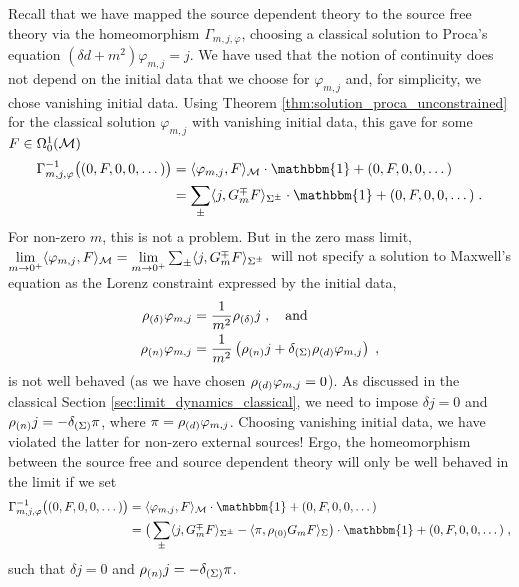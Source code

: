 Recall that we have mapped the source dependent theory to the source free theory via the homeomorphism $\Gamma_{m,j,\varphi}$, choosing a classical solution to Proca's equation $(\delta d + m^2)\varphi_{m,j} = j$. We have used that the notion of continuity does not depend on the initial data that we choose for $\varphi_{m,j}$ and, for simplicity, we chose vanishing initial data. Using Theorem \ref{thm:solution_proca_unconstrained} for the classical solution $\varphi_{m,j}$ with vanishing initial data, this gave for some $F \in \Omega^1_0(\mathcal{M})$
\begin{align}
	\Gamma^{-1}_{m,j,\varphi}\big( (0,F,0,0,\dots) \big)
	&= \langle \varphi_{m,j} , F \rangle_\M \cdot \mathbbm{1} + (0,F,0,0,\dots)   \notag \\
	&= \sum_{\pm}\langle j ,G_m^\mp F \rangle_{\Sigma^\pm} \cdot \mathbbm{1} + (0,F,0,0,\dots) \formspace.
\end{align}
For non-zero $m$, this is not a problem. But in the zero mass limit, $\lim\limits_{m \to 0^+} \langle \varphi_{m,j} , F \rangle_{\mathcal{M}} = \lim\limits_{m \to 0^+}  \sum_{\pm}\langle j ,G_m^\mp F \rangle_{\Sigma^\pm}$ will not specify a solution to Maxwell's equation as the Lorenz constraint expressed by the initial data,
\begin{align}
	\rho_{(\delta)} \varphi_{m,j} &= \frac{1}{m^2}\rho_{(\delta)} j \; , \quad \text{and} \\
	\rho_{(n)} \varphi_{m,j} &= \frac{1}{m^2}\left( \rho_{(n)} j  + \delta_{(\Sigma)} \rho_{(d)} \varphi_{m,j} \right) \;,
\end{align}
is not well behaved (as we have chosen $\rho_{(d)} \varphi_{m,j}=0$). As discussed in the classical Section \ref{sec:limit_dynamics_classical}, we need to impose $\delta j=0$ and $\rho_{(n)} j= -\delta_{(\Sigma)} \pi$, where $\pi = \rho_{(d)} \varphi_{m,j}$. Choosing vanishing initial data, we have violated the latter for non-zero external sources! Ergo, the homeomorphism between the source free and source dependent theory will only be well behaved in the limit if we set
\begin{align}
	\Gamma^{-1}_{m,j,\varphi} \big( (0,F,0,0,\dots) \big)
	&= \langle \varphi_{m,j} , F \rangle_\M \cdot \mathbbm{1} +(0,F,0,0,\dots)  \\
	&= \big(  \sum_{\pm}\langle j ,G_m^\mp F \rangle_{\Sigma^\pm} - \langle \pi , \rhoz G_m F\rangle_\Sigma \big) \cdot \mathbbm{1} +(0,F,0,0,\dots) \formspace,\notag
\end{align}
such that $\delta j=0$ and $\rho_{(n)} j= -\delta_{(\Sigma)} \pi$.\\
